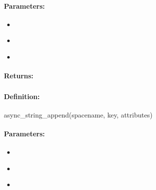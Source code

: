 \paragraph{Parameters:}
\begin{itemize}[noitemsep]
\item {}\\

\item {}\\

\item {}\\

\end{itemize}

\paragraph{Returns:}


\pagebreak
\subsubsection{}
\label{api:ruby:async_string_append}


\paragraph{Definition:}
\begin{rubycode}
async_string_append(spacename, key, attributes)
\end{rubycode}

\paragraph{Parameters:}
\begin{itemize}[noitemsep]
\item {}\\

\item {}\\

\item {}\\

\end{itemize}

